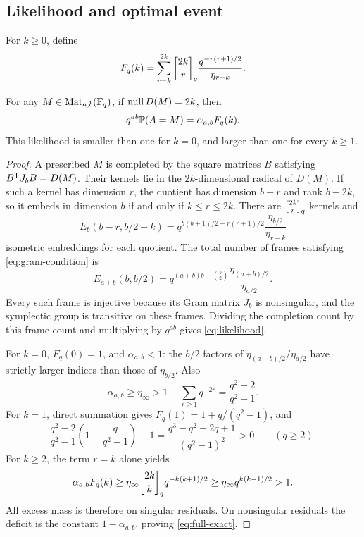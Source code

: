 \subsection{Likelihood and optimal event}

For \(k\ge0\), define
\begin{equation}\label{eq:F}
 F_q(k)=\sum_{r=k}^{2k}\qbin{2k}{r}
                 \frac{q^{-r(r+1)/2}}{\eta_{r-k}}.
\end{equation}

\begin{proposition}\label{prop:likelihood}
For any \(M\in\operatorname{Mat}_{a,b}(\mathbb F_q)\), if \(\operatorname{null} D(M)=2k\), then
\begin{equation}\label{eq:likelihood}
 q^{ab}\mathbb P(A=M)=\alpha_{a,b}F_q(k).
\end{equation}
This likelihood is smaller than one for \(k=0\), and larger than one
for every \(k\ge1\).
\end{proposition}

\begin{proof}
A prescribed \(M\) is completed by the square matrices \(B\) satisfying
\(B^{\mathsf T}J_bB=D(M)\).
Their kernels lie in the \(2k\)-dimensional radical of \(D(M)\).
If such a kernel has dimension \(r\), the quotient has dimension \(b-r\)
and rank \(b-2k\), so it embeds in dimension \(b\) if and only if
\(k\le r\le2k\). There are \(\qbin{2k}{r}\) kernels and
\[
 E_b(b-r,b/2-k)
   =q^{b(b+1)/2-r(r+1)/2}\frac{\eta_{b/2}}{\eta_{r-k}}
\]
isometric embeddings for each quotient.
The total number of frames satisfying \eqref{eq:gram-condition} is
\[
 E_{a+b}(b,b/2)
 =q^{(a+b)b-\binom b2}\frac{\eta_{(a+b)/2}}{\eta_{a/2}}.
\]
Every such frame is injective because its Gram matrix \(J_b\) is
nonsingular, and the symplectic group is transitive on these frames.
Dividing the completion count by this frame count and multiplying by
\(q^{ab}\) gives \eqref{eq:likelihood}.

For \(k=0\), \(F_q(0)=1\), and \(\alpha_{a,b}<1\):
the \(b/2\) factors of
\(\eta_{(a+b)/2}/\eta_{a/2}\) have strictly larger indices than those of
\(\eta_{b/2}\).
Also
\[
 \alpha_{a,b}\ge\eta_\infty
       >1-\sum_{r\ge1}q^{-2r}
       =\frac{q^2-2}{q^2-1}.
\]
For \(k=1\), direct summation gives
\(F_q(1)=1+q/(q^2-1)\), and
\[
 \frac{q^2-2}{q^2-1}
      \left(1+\frac q{q^2-1}\right)-1
   =\frac{q^3-q^2-2q+1}{(q^2-1)^2}>0
       \qquad(q\ge2).
\]
For \(k\ge2\), the term \(r=k\) alone yields
\[
 \alpha_{a,b}F_q(k)
 \ge\eta_\infty\qbin{2k}{k}q^{-k(k+1)/2}
 \ge\eta_\infty q^{k(k-1)/2}>1.
\]
All excess mass is therefore on singular residuals. On nonsingular
residuals the deficit is the constant \(1-\alpha_{a,b}\), proving
\eqref{eq:full-exact}.
\end{proof}

